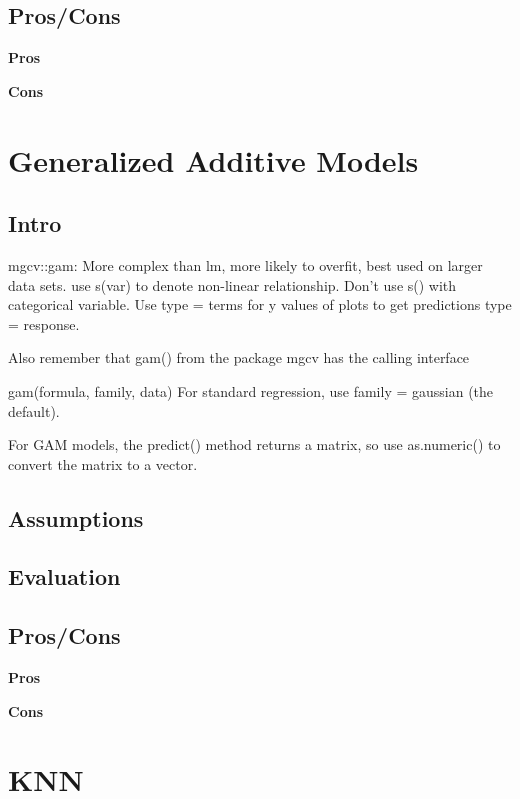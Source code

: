 \documentclass[]{book}
\theoremstyle{definition}
\theoremstyle{definition}
\theoremstyle{definition}
\theoremstyle{remark}
\begin{document}
\subsection{Pros/Cons}\label{proscons-9}

\textbf{Pros}

\textbf{Cons}

\section{Generalized Additive Models}\label{generalized-additive-models}

\subsection{Intro}\label{intro-10}

mgcv::gam: More complex than lm, more likely to overfit, best used on
larger data sets. use s(var) to denote non-linear relationship. Don't
use s() with categorical variable. Use type = terms for y values of
plots to get predictions type = response.

Also remember that gam() from the package mgcv has the calling interface

gam(formula, family, data) For standard regression, use family =
gaussian (the default).

For GAM models, the predict() method returns a matrix, so use
as.numeric() to convert the matrix to a vector.

\subsection{Assumptions}\label{assumptions-10}

\subsection{Evaluation}\label{evaluation-10}

\subsection{Pros/Cons}\label{proscons-10}

\textbf{Pros}

\textbf{Cons}

\section{KNN}\label{knn}
\end{document}
